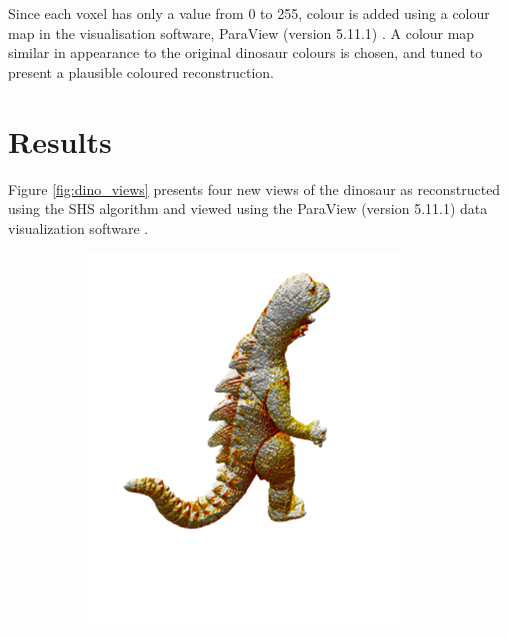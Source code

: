 Since each voxel has only a value from 0 to 255, colour is added using a colour map in the visualisation software, ParaView (version 5.11.1) \cite{kitware_2023}. A colour map similar in appearance to the original dinosaur colours is chosen, and tuned to present a plausible coloured reconstruction.

\newpage
\section{Results}

Figure \ref{fig:dino_views} presents four new views of the dinosaur as reconstructed using the SHS algorithm and viewed using the ParaView (version 5.11.1) data visualization software \cite{kitware_2023}.

\begin{figure}[ht]
  \centering
  \begin{subfigure}[b]{0.4\textwidth}
    \centering
    \includegraphics[width=\textwidth]{images/q2_dino_view_1.png}
    \caption{}
  \end{subfigure}
  \hspace{4em}

\end{figure}
